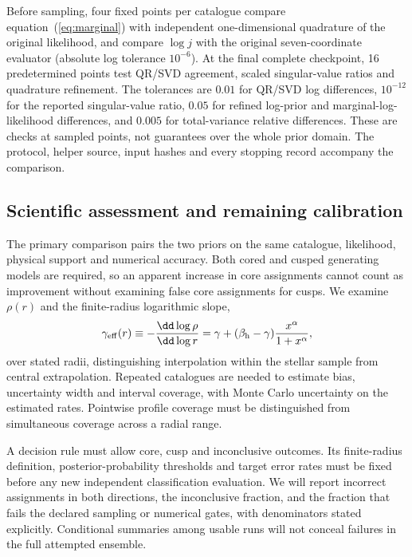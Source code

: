Before sampling, four fixed points per catalogue compare equation~(\ref{eq:marginal}) with independent one-dimensional quadrature of the original likelihood, and compare $\log j$ with the original seven-coordinate evaluator (absolute log tolerance $10^{-6}$). At the final complete checkpoint, 16 predetermined points test QR/SVD agreement, scaled singular-value ratios and quadrature refinement. The tolerances are $0.01$ for QR/SVD log differences, $10^{-12}$ for the reported singular-value ratio, $0.05$ for refined log-prior and marginal-log-likelihood differences, and $0.005$ for total-variance relative differences. These are checks at sampled points, not guarantees over the whole prior domain. The protocol, helper source, input hashes and every stopping record accompany the comparison.

\subsection{Scientific assessment and remaining calibration}
\label{sec:assessment}
The primary comparison pairs the two priors on the same catalogue, likelihood, physical support and numerical accuracy. Both cored and cusped generating models are required, so an apparent increase in core assignments cannot count as improvement without examining false core assignments for cusps. We examine $\rho(r)$ and the finite-radius logarithmic slope,
\begin{equation}
 \gamma_{\rm eff}(r)\equiv-\frac{\dd\log\rho}{\dd\log r}
 =\gamma+(\beta_{\rm h}-\gamma)\frac{x^\alpha}{1+x^\alpha},
 \label{eq:slope}
\end{equation}
over stated radii, distinguishing interpolation within the stellar sample from central extrapolation. Repeated catalogues are needed to estimate bias, uncertainty width and interval coverage, with Monte Carlo uncertainty on the estimated rates. Pointwise profile coverage must be distinguished from simultaneous coverage across a radial range.

A decision rule must allow core, cusp and inconclusive outcomes. Its finite-radius definition, posterior-probability thresholds and target error rates must be fixed before any new independent classification evaluation. We will report incorrect assignments in both directions, the inconclusive fraction, and the fraction that fails the declared sampling or numerical gates, with denominators stated explicitly. Conditional summaries among usable runs will not conceal failures in the full attempted ensemble.

